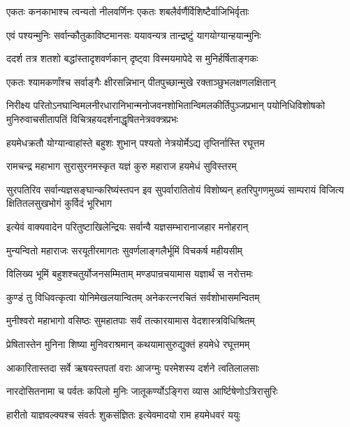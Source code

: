 \twolineshloka
{एकतः कनकाभाश्च त्वन्यतो नीलवर्णिनः}
{एकतः शबलैर्वर्णैर्विशिष्टैर्वाजिभिर्वृताः}%

\twolineshloka
{एवं पश्यन्मुनिः सर्वान्कौतुकाविष्टमानसः}
{ययावन्यत्र तान्द्रष्टुं यागयोग्यान्हयान्मुनिः}%

\twolineshloka
{ददर्श तत्र शतशो बद्धांस्तादृशवर्णकान्}
{दृष्ट्वा विस्मयमापेदे स मुनिर्हर्षिताङ्गकः}%

\twolineshloka
{एकतः श्यामकर्णांश्च सर्वाङ्गैः क्षीरसन्निभान्}
{पीतपुच्छान्मुखे रक्ताञ्छुभलक्षणलक्षितान्}%

\twolineshloka
{निरीक्ष्य परितोऽनघान्विमलनीरधारानिभान्मनोजवनशोभितान्विमलकीर्तिपुञ्जप्रभान्}
{पयोनिधिविशोषको मुनिरुवाचसीतापतिं विचित्रहयदर्शनाद्धृषितनेत्रवक्त्रप्रभः}%


\twolineshloka
{हयमेधक्रतौ योग्यान्वाहांस्ते बहुशः शुभान्}
{पश्यतो नेत्रयोर्मेऽद्य तृप्तिर्नास्ति रघूत्तम}%

\twolineshloka
{रामचन्द्र महाभाग सुरासुरनमस्कृत}
{यज्ञं कुरु महाराज हयमेधं सुविस्तरम्}%

\twolineshloka
{सुरपतिरिव सर्वान्यज्ञसङ्घान्करिष्यंस्तपन इव सुपर्वारातितोयं विशोष्यन्}
{हतरिपुगणमुख्यं साम्परायं विजित्य क्षितितलसुखभोगं कुर्विदं भूरिभाग}%

\twolineshloka
{इत्येवं वाक्यवादेन परितुष्टाखिलेन्द्रियः}
{सर्वान्वै यज्ञसम्भारानाजहार मनोहरान्}%

\twolineshloka
{मुन्यन्वितो महाराजः सरयूतीरमागतः}
{सुवर्णलाङ्गलैर्भूमिं विचकर्ष महीयसीम्}%

\twolineshloka
{विलिख्य भूमिं बहुशश्चतुर्योजनसम्मिताम्}
{मण्डपान्रचयामास यज्ञार्थं स नरोत्तमः}%

\twolineshloka
{कुण्डं तु विधिवत्कृत्वा योनिमेखलयान्वितम्}
{अनेकरत्नरचितं सर्वशोभासमन्वितम्}%

\twolineshloka
{मुनीश्वरो महाभागो वसिष्ठः सुमहातपाः}
{सर्वं तत्कारयामास वेदशास्त्रविधिश्रितम्}%

\twolineshloka
{प्रेषितास्तेन मुनिना शिष्या मुनिवराश्रमान्}
{कथयामासुरुद्युक्तं हयमेधे रघूत्तमम्}%

\twolineshloka
{आकारितास्तदा सर्वे ऋषयस्तपतां वराः}
{आजग्मुः परमेशस्य दर्शने त्वतिलालसाः}%

\twolineshloka
{नारदोसितनामा च पर्वतः कपिलो मुनिः}
{जातूकर्ण्योऽङ्गिरा व्यास आर्ष्टिषेणोऽत्रिरासुरिः}%

\twolineshloka
{हारीतो याज्ञवल्क्यश्च संवर्तः शुकसंज्ञितः}
{इत्येवमादयो राम हयमेधवरं ययुः}%

